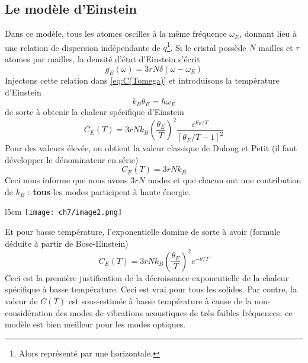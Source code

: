 	\subsection{Le modèle d'Einstein}
	Dans ce modèle, tous les atomes oscilles à la même fréquence $\omega_E$, 
	donnant lieu à une relation de dispersion indépendante de $q$\footnote{
	Alors représenté par une horizontale.}. Si le cristal possède $N$ mailles 
	et $r$ atomes par mailles, la densité d'état d'Einstein s'écrit
	\begin{equation}
	g_E(\omega) = 3rN\delta(\omega-\omega_E)
	\end{equation}
	Injectons cette relation dans \autoref{eq:C(Tomega)} et introduisons la 
	température d'Einstein 
	\begin{equation}
	k_B\theta_E = \hbar \omega_E
	\end{equation}
	de sorte à obtenir la chaleur spécifique d'Einstein
	\begin{equation}
	C_E(T) = 3rNk_B\left(\dfrac{\theta_E}{T}\right)^2\dfrac{e^{\theta_E/T}}{
	\left[\theta_E/T-1\right]^2}
	\end{equation}
	Pour des valeurs élevée, on obtient la valeur classique de Dulong et Petit
	(il faut développer le dénominateur  en série)
	\begin{equation}
	C_E(T) = 3rNk_B
	\end{equation}
	Ceci nous informe que nous avons $3rN$ modes et que chacun ont une 
	contribution de $k_B$ : \textbf{tous} les modes participent à haute énergie.

	\newpage
		\begin{wrapfigure}[10]{l}{5cm}
	\vspace{-0.2cm}
	\texttt{[image: ch7/image2.png]}
	\end{wrapfigure}
	Et pour basse température, l'exponentielle domine de sorte à avoir (formule 
	déduite à partir de Bose-Einstein) 
	\begin{equation}
	C_E(T) = 3rNk_B\left(\dfrac{\theta_E}{T}\right)^2e^{-\theta/T}
	\end{equation}
	Ceci est la première justification de la décroissance exponentielle de la 
	chaleur spécifique à basse température. Ceci est vrai  pour tous les solides. 
	Par contre, la valeur de $C(T)$ est sous-estimée à basse température à cause 
	de la non-considération des modes de vibrations acoustiques de très faibles 
	fréquences: ce modèle est bien meilleur pour les modes optiques.	




